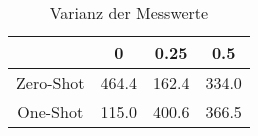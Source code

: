 \bgroup
\def\arraystretch{2}
\begin{table}[H]
	\vspace{.5cm}
	\centering		
	\begin{center}
		\begin{tabular}{|c||c|c|c|}
			\hline 
			& 0 & 0.25 & 0.5 \\
			\hline 
			\hline
			Zero-Shot & 464.4 & 162.4 & 334.0 \\
			\hline
			One-Shot & 115.0 & 400.6 & 366.5 \\
			\hline
		\end{tabular} 
	\end{center}
	\caption{Varianz der Messwerte}
	\label{fig:branch-var}
	\vspace{-.8cm}
\end{table}
\egroup